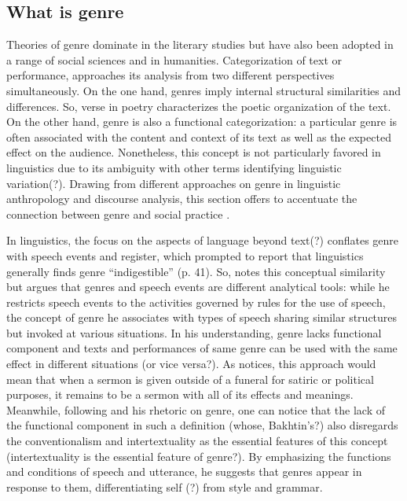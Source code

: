\documentclass[12pt]{turabian-researchpaper}
\begin{document}
\subsection{What is genre}
Theories of genre dominate in the literary studies but have also been adopted in a range of social sciences and in humanities. Categorization of text or performance, approaches its analysis from two different perspectives simultaneously. On the one hand, genres imply internal structural similarities and differences. So, verse in poetry characterizes the poetic organization of the text. On the other hand, genre is also a functional categorization: a particular genre is often associated with the content and context of its text as well as the expected effect on the audience. Nonetheless, this concept is not particularly favored in linguistics due to its ambiguity with other terms identifying linguistic variation(?). Drawing from different approaches on genre in linguistic anthropology and discourse analysis, this section offers to accentuate the connection between genre and social practice \parencite{hanks1987}.  

In linguistics, the focus on the aspects of language beyond text(?) conflates genre with speech events and register, which prompted \textcite{swales1990} to report that linguistics generally finds genre ``indigestible'' (p. 41). So, \textcite{hymes1974} notes this conceptual similarity but argues that genres and speech events are different analytical tools: while he restricts speech events to the activities governed by rules for the use of speech, the concept of genre he associates with types of speech sharing similar structures but invoked at various situations. In his understanding, genre lacks functional component and texts and performances of same genre can be used with the same effect in different situations (or vice versa?). As \textcite{swales1990} notices, this approach would mean that when a sermon is given outside of a funeral for satiric or political purposes, it remains to be a sermon with all of its effects and meanings. Meanwhile, following \textcite{bakhtin1986} and his rhetoric on genre, one can notice that the lack of the functional component in such a definition (whose, Bakhtin's?) also disregards the conventionalism and intertextuality as the essential features of this concept (intertextuality is the essential feature of genre?). By emphasizing the functions and conditions of speech and utterance, he suggests that genres appear in response to them, differentiating self (?) from style and grammar.  
\end{document}
